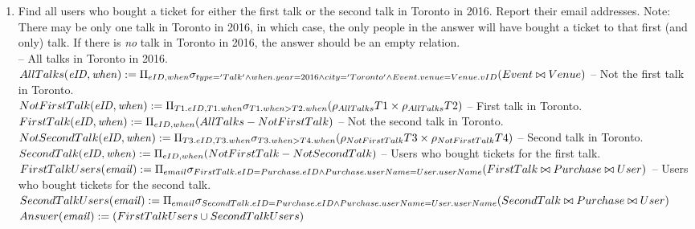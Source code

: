 \documentclass{article}
\newcommand{\var}[1]{\mathit{#1}}
\begin{document}
\begin{enumerate}
\item   %
Find all users who bought a ticket for either the first talk or the second talk in Toronto in 2016.
Report their email addresses.
Note: There may be only one talk in Toronto in 2016, 
in which case, the only people in the answer will have bought a ticket to that first (and only) talk.
If there is {\it no} talk in Toronto in 2016, the answer should be an empty relation. \\[5pt]
-- All talks in Toronto in 2016. \\[5pt]
{ \large
$
AllTalks(\var{eID, when}) := 
	\Pi_{eID, when} 
	\sigma_{
		type='Talk' \wedge
		when.year=2016 \wedge
		city='Toronto' \wedge
		Event.venue=Venue.vID
		}\\
	(Event \bowtie Venue) \\[10pt]
$
}
-- Not the first talk in Toronto. \\[5pt]
{ \large
$
NotFirstTalk(\var{eID, when}) := 
	\Pi_{T1.eID, T1.when} 
	\sigma_{
		T1.when > T2.when
		}
	(\rho_{AllTalks}T1 \times \rho_{AllTalks}T2) \\[10pt]
$
}
-- First talk in Toronto. \\[5pt]
{ \large
$
FirstTalk(\var{eID, when}) := 
	\Pi_{eID, when} 
	(AllTalks - NotFirstTalk) \\[10pt]
$
}
-- Not the second talk in Toronto. \\[5pt]
{ \large
$
NotSecondTalk(\var{eID, when}) := 
	\Pi_{T3.eID, T3.when} 
	\sigma_{
		T3.when > T4.when
		}
	(\rho_{NotFirstTalk}T3 \times \rho_{NotFirstTalk}T4) \\[10pt]
$
}
-- Second talk in Toronto. \\[5pt]
{ \large
$
SecondTalk(\var{eID, when}) := 
	\Pi_{eID, when} 
	(NotFirstTalk - NotSecondTalk) \\[40pt]
$
}
-- Users who bought tickets for the first talk. \\[5pt]
{ \large
$
FirstTalkUsers(\var{email}) := 
	\Pi_{email} 
	\sigma_{
		FirstTalk.eID=Purchase.eID \wedge
		Purchase.userName=User.userName} \\
	(FirstTalk \bowtie Purchase \bowtie User)\\[10pt]
$
}
-- Users who bought tickets for the second talk. \\[5pt]
{ \large
$
SecondTalkUsers(\var{email}) := 
	\Pi_{email} 
	\sigma_{
		SecondTalk.eID=Purchase.eID \wedge
		Purchase.userName=User.userName } \\
	(SecondTalk \bowtie Purchase \bowtie User)\\[10pt]
$
$
Answer(\var{email}) := 
	(FirstTalkUsers \cup SecondTalkUsers) \\[10pt]
$
}
\end{enumerate}
\end{document}
